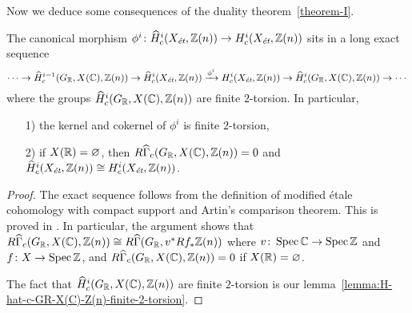 \documentclass{article}
\numberwithin{equation}{section}
\begin{document}
Now we deduce some consequences of the duality theorem~\ref{theorem-I}.

\begin{lemma}
  \label{lemma:morphism-hat-Hc(Xet,Z(n))->Hc(Xet,Z(n))}
  The canonical morphism
  $\phi^i\colon \widehat{H}^i_c (X_\et, \ZZ (n)) \to H^i_c (X_\et, \ZZ (n))$
  sits in a long exact sequence
  \[ \cdots \to \widehat{H}^{i-1}_c (G_\RR, X (\CC), \ZZ (n)) \to
  \widehat{H}_c^i (X_\et, \ZZ(n)) \xrightarrow{\phi^i}
  H_c^i (X_\et, \ZZ(n)) \to
  \widehat{H}^i_c (G_\RR, X (\CC), \ZZ (n)) \to \cdots \]
  where the groups $\widehat{H}^i_c (G_\RR, X (\CC), \ZZ (n))$ are finite
  $2$-torsion. In particular,
  \begin{enumerate}
  \item[1)] the kernel and cokernel of $\phi^i$ is finite $2$-torsion,

  \item[2)] if $X (\RR) = \emptyset$, then
    $R\widehat{\Gamma}_c (G_\RR, X (\CC), \ZZ (n)) = 0$ and
    $\widehat{H}^i_c (X_\et, \ZZ (n)) \cong H^i_c (X_\et, \ZZ (n))$.
  \end{enumerate}

  \begin{proof}
    The exact sequence follows from the definition of modified étale cohomology
    with compact support and Artin's comparison theorem. This is proved in
    \cite[Lemma~6.14]{Flach-Morin-2018}. In particular, the argument shows that
    $R\widehat{\Gamma}_c (G_\RR, X (\CC), \ZZ (n)) \cong
    R\widehat{\Gamma} (G_\RR, v^* Rf_* \ZZ(n))$ where
    $v\colon \Spec \CC \to \Spec \ZZ$ and $f\colon X\to \Spec \ZZ$,
    and $R\widehat{\Gamma}_c (G_\RR, X (\CC), \ZZ (n)) = 0$ if
    $X (\RR) = \emptyset$.

    The fact that $\widehat{H}^i_c (G_\RR, X (\CC), \ZZ (n))$ are finite
    $2$-torsion is our lemma~\ref{lemma:H-hat-c-GR-X(C)-Z(n)-finite-2-torsion}.
  \end{proof}
\end{lemma}
\end{document}
